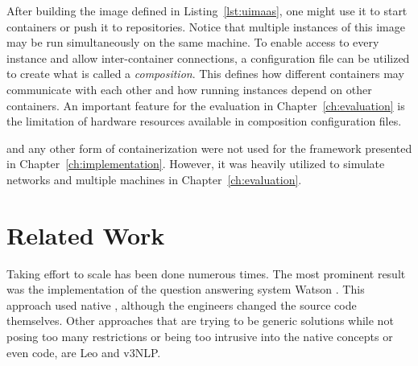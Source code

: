 After building the image defined in Listing~\ref{lst:uimaas}, one might use it to start containers or push it to repositories. Notice that multiple instances of this image may be run simultaneously on the same machine. To enable access to every instance and allow inter-container connections, a configuration file can be utilized to create what is called a \emph{\docker{} composition}. This defines how different containers may communicate with each other and how running instances depend on other containers. An important feature for the evaluation in Chapter~\ref{ch:evaluation} is the limitation of hardware resources available in composition configuration files.

\docker{} and any other form of containerization were not used for the framework presented in Chapter~\ref{ch:implementation}. However, it was heavily utilized to simulate networks and multiple machines in Chapter~\ref{ch:evaluation}.

\section{Related Work}
\label{sec:related}
Taking effort to scale \uima{} has been done numerous times. The most prominent result was the implementation of the question answering system Watson \cite{epstein2012making}. This approach used native \uimaas{}, although the engineers changed the \uimaas{} source code themselves. Other approaches that are trying to be generic solutions while not posing too many restrictions or being too intrusive into the native \uima{} concepts or even code, are Leo and v3NLP.

